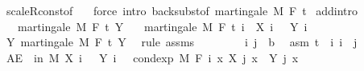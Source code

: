 \begin{isabellebody}
\isamarkupfalse%
\ scaleR{\isacharunderscore}{\kern0pt}const{\isacharbrackleft}{\kern0pt}of\ {\isachardoublequoteopen}{\isacharminus}{\kern0pt}{}{\isachardoublequoteclose}{\isacharbrackright}{\kern0pt}\ \isamarkupfalse%
\ {\isacharparenleft}{\kern0pt}force\ intro{\isacharcolon}{\kern0pt}\ back{\isacharunderscore}{\kern0pt}subst{\isacharbrackleft}{\kern0pt}of\ {\isachardoublequoteopen}martingale\ M\ F\ t%
\endisatagproof
{\isafoldproof}%
%
\isadelimproof
\isanewline
%
\endisadelimproof
\isanewline
{}\isamarkupfalse%
\ add{\isacharbrackleft}{\kern0pt}intro{\isacharbrackright}{\kern0pt}{\isacharcolon}{\kern0pt}\isanewline
\ \ \ {\isachardoublequoteopen}martingale\ M\ F\ t\ Y{\isachardoublequoteclose}\isanewline
\ \ \ {\isachardoublequoteopen}martingale\ M\ F\ t\ {\isacharparenleft}{\kern0pt}{\isasymlambda}i\ {\isasymxi}{\isachardot}{\kern0pt}\ X\ i\ {\isasymxi}\ {\isacharplus}{\kern0pt}\ Y\ i\ {\isasymxi}{\isacharparenright}{\kern0pt}{\isachardoublequoteclose}\isanewline
%
\isadelimproof
%
\endisadelimproof
%
\isatagproof
{}\isamarkupfalse%
\ {\isacharminus}{\kern0pt}\isanewline
\ \ \isamarkupfalse%
\ Y{\isacharcolon}{\kern0pt}\ martingale\ M\ F\ t\ Y\ \isamarkupfalse%
\ {\isacharparenleft}{\kern0pt}rule\ assms{\isacharparenright}{\kern0pt}\isanewline
\ \ \isacommand{{\isacharbraceleft}{\kern0pt}}\isamarkupfalse%
\isanewline
\ \ \ \ \isamarkupfalse%
\ i\ j\ {\isacharcolon}{\kern0pt}{\isacharcolon}{\kern0pt}\ {\isacharprime}{\kern0pt}b\ \isamarkupfalse%
\ asm{\isacharcolon}{\kern0pt}\ {\isachardoublequoteopen}t\ {\isasymle}\ i{\isachardoublequoteclose}\ {\isachardoublequoteopen}i\ {\isasymle}\ j{\isachardoublequoteclose}\isanewline
\ \ \ \ \isamarkupfalse%
\ {\isachardoublequoteopen}AE\ {\isasymxi}\ in\ M{\isachardot}{\kern0pt}\ X\ i\ {\isasymxi}\ {\isacharplus}{\kern0pt}\ Y\ i\ {\isasymxi}\ {\isacharequal}{\kern0pt}\ cond{\isacharunderscore}{\kern0pt}exp\ M\ {\isacharparenleft}{\kern0pt}F\ i{\isacharparenright}{\kern0pt}\ {\isacharparenleft}{\kern0pt}{\isasymlambda}x{\isachardot}{\kern0pt}\ X\ j\ x\ {\isacharplus}{\kern0pt}\ Y\ j\ x{\isacharparenright}{\kern0pt}\ {\isasymxi}{\isachardoublequoteclose}\ \isanewline
\ \ \ \ \ \ \isamarkupfalse%

\end{isabellebody}
